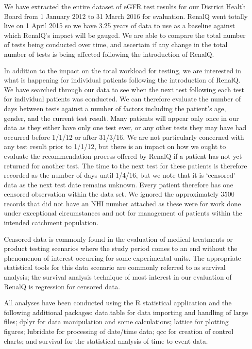 We have extracted the entire dataset of eGFR test results for our District Health Board from 1 January 2012 to 31 March 2016 for evaluation. RenalQ went totally live on 1 April 2015 so we have 3.25 years of data to use as a baseline against which RenalQ's impact will be gauged. We are able to compare the total number of tests being conducted over time, and ascertain if any change in the total number of tests is being affected following the introduction of RenalQ.  

In addition to the impact on the total workload for testing, we are interested in what is happening for individual patients following the introduction of RenalQ. 
We have searched through our data to see when the next test following each test for individual patients was conducted.  We can therefore evaluate the number of days between tests against a number of factors including the patient's age, gender, and the current test result.
Many patients will appear only once in our data as they either have only one test ever, or any other tests they may have had occurred before 1/1/12 or after 31/3/16. We are not particularly concerned with any test result prior to 1/1/12, but there is an impact on how we ought to evaluate the recommendation process offered by RenalQ if a patient has not yet returned for another test. The time to the next test for these patients is therefore recorded as the number of days until 1/4/16, but we note that it is `censored' data as the next test date remains unknown. Every patient therefore has one censored observation within the data set. We ignored the approximately 3500 records that did not have an NHI number attached as these were for work done under exceptional circumstances and not for management of patients within the intended catchment population.


Censored data is commonly found in the evaluation of medical treatments or product testing scenarios where the study period comes to an end without the phenomenon of interest occurring for some experimental units. The appropriate statistical tools for this data scenario are commonly referred to as survival analysis; the survival analysis technique of most interest in our evaluation of RenalQ is  regression for censored data.

All analyses have been conducted using the R statistical application \citep{RItself} and the following additional packages: data.table \citep{data.tablePkg} for data importing and handling of large files; dplyr \citep{dplyrPkg} for data manipulation and some calculations; lattice \citep{latticePkg} for plotting figures; lubridate \citep{lubridatePkg} for processing of date/time data; qcc \citep{qccPkg} for creation of control charts; and survival \citep{survivalPkg} for the statistical analysis of time to event data.


